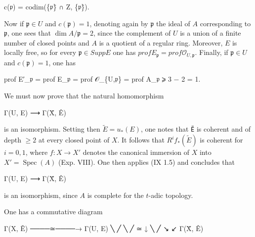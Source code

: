 \documentclass[
  11pt,
  a4paper,
]{book}
\newenvironment{Shaded}{}{}
\newcommand{\NormalTok}[1]{#1}
\begin{document}
\begin{Shaded}
\begin{Highlighting}[]
\NormalTok{c(𝔭) = codim(\{𝔭\}̄ ∩ Z, \{𝔭\}̄).}
\end{Highlighting}
\end{Shaded}

Now if \(\mathfrak{p} \in U\) and \(c(\mathfrak{p}) = 1\), denoting
again by \(\mathfrak{p}\) the ideal of \(A\) corresponding to
\(\mathfrak{p}\), one sees that \(\dim A/\mathfrak{p} = 2\), since the
complement of \(U\) is a union of a finite number of closed points and
\(A\) is a quotient of a regular ring. Moreover, \(E\) is locally free,
so for every \(\mathfrak{p} \in
Supp E\) one has
\(prof E_{\mathfrak{p}} = prof \mathcal{O}_{U,\mathfrak{p}}\). Finally,
if \(\mathfrak{p} \in U\) and \(c(\mathfrak{p}) = 1\), one has

\begin{Shaded}
\begin{Highlighting}[]
\NormalTok{prof E′\_𝔭 = prof E\_𝔭 = prof 𝒪\_\{U,𝔭\} = prof A\_𝔭 ⩾ 3 − 2 = 1.}
\end{Highlighting}
\end{Shaded}

We must now prove that the natural homomorphism

\begin{Shaded}
\begin{Highlighting}[]
\NormalTok{Γ(U, E) ⟶ Γ(X̂, Ê)}
\end{Highlighting}
\end{Shaded}

is an isomorphism. Setting then \(\tilde{E} = u_{*}(E)\), one notes that
\texttt{Ẽ} is coherent and of depth \(\geqslant 2\) at every closed
point of \(X\). It follows that \(R^{i} f_{*}(\tilde{E})\) is coherent
for \(i = 0, 1\), where \(f: X \to X'\) denotes the canonical immersion
of \(X\) into \(X' = \operatorname{Spec}(A)\) (Exp. VIII). One then
applies (IX 1.5) and concludes that

\begin{Shaded}
\begin{Highlighting}[]
\NormalTok{Γ(U, E) ⟶ Γ(X̂, Ê)}
\end{Highlighting}
\end{Shaded}

is an isomorphism, since \(A\) is complete for the \(t\)-adic topology.

\begin{samepage}
One has a commutative diagram

\begin{Shaded}
\begin{Highlighting}[]
\NormalTok{       Γ(X, Ẽ) ────≃────→ Γ(U, E)}
\NormalTok{            ╲              ╱}
\NormalTok{             ╲            ╱}
\NormalTok{              ≃          ↓}
\NormalTok{               ╲        ╱}
\NormalTok{                ↘     ↙}
\NormalTok{                Γ(X̂, Ê)}
\end{Highlighting}
\end{Shaded}
\end{samepage}
\end{document}
